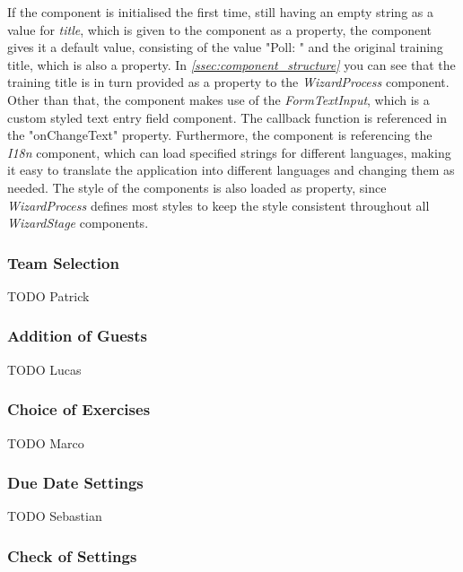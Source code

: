 If the component is initialised the first time, still having an empty string as a value for \textit{title}, which is given to the component as a property, the component gives it a default value, consisting of the value "Poll: " and the original training title, which is also a property. In \textit{\ref{ssec:component_structure} } you can see that the training title is in turn provided as a property to the \textit{WizardProcess} component.
\newline
Other than that, the component makes use of the \textit{FormTextInput}, which is a custom styled text entry field component. The callback function is referenced in the "onChangeText" property. Furthermore, the component is referencing the \textit{I18n} component, which can load specified strings for different languages, making it easy to translate the application into different languages and changing them as needed. The style of the components is also loaded as property, since \textit{WizardProcess} defines most styles to keep the style consistent throughout all \textit{WizardStage} components.

\subsubsection{Team Selection}
\label{sssec:poll_team}

TODO Patrick

\subsubsection{Addition of Guests}
\label{sssec:poll_guests}

TODO Lucas

\subsubsection{Choice of Exercises}
\label{sssec:poll_exercises}

TODO Marco

\subsubsection{Due Date Settings}
\label{sssec:poll_due_date}

TODO Sebastian

\subsubsection{Check of Settings}
\label{sssec:poll_check}

